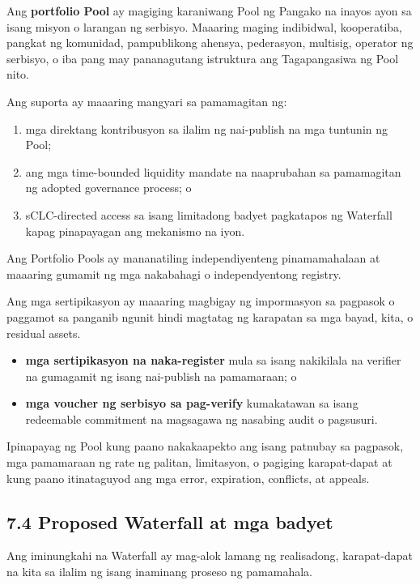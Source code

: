 \documentclass[11pt]{article}
\begin{document}
Ang \textbf{portfolio Pool} ay magiging karaniwang Pool ng Pangako na inayos ayon sa isang misyon o larangan ng serbisyo. Maaaring maging indibidwal, kooperatiba, pangkat ng komunidad, pampublikong ahensya, pederasyon, multisig, operator ng serbisyo, o iba pang may pananagutang istruktura ang Tagapangasiwa ng Pool nito.

Ang suporta ay maaaring mangyari sa pamamagitan ng:

\begin{enumerate}[leftmargin=*]
\item mga direktang kontribusyon sa ilalim ng nai-publish na mga tuntunin ng Pool;
\item ang mga time-bounded liquidity mandate na naaprubahan sa pamamagitan ng adopted governance process; o
\item sCLC-directed access sa isang limitadong badyet pagkatapos ng Waterfall kapag pinapayagan ang mekanismo na iyon.
\end{enumerate}
Ang Portfolio Pools ay mananatiling independiyenteng pinamamahalaan at maaaring gumamit ng mga nakabahagi o independyentong registry.

Ang mga sertipikasyon ay maaaring magbigay ng impormasyon sa pagpasok o paggamot sa panganib ngunit hindi magtatag ng karapatan sa mga bayad, kita, o residual assets.

\begin{itemize}[leftmargin=*]
\item \textbf{mga sertipikasyon na naka-register} mula sa isang nakikilala na verifier na gumagamit ng isang nai-publish na pamamaraan; o
\item \textbf{mga voucher ng serbisyo sa pag-verify} kumakatawan sa isang redeemable commitment na magsagawa ng nasabing audit o pagsusuri.
\end{itemize}
Ipinapayag ng Pool kung paano nakakaapekto ang isang patnubay sa pagpasok, mga pamamaraan ng rate ng palitan, limitasyon, o pagiging karapat-dapat at kung paano itinataguyod ang mga error, expiration, conflicts, at appeals.

\subsection*{7.4 Proposed Waterfall at mga badyet}

Ang iminungkahi na Waterfall ay mag-alok lamang ng realisadong, karapat-dapat na kita sa ilalim ng isang inaminang proseso ng pamamahala.
\end{document}
